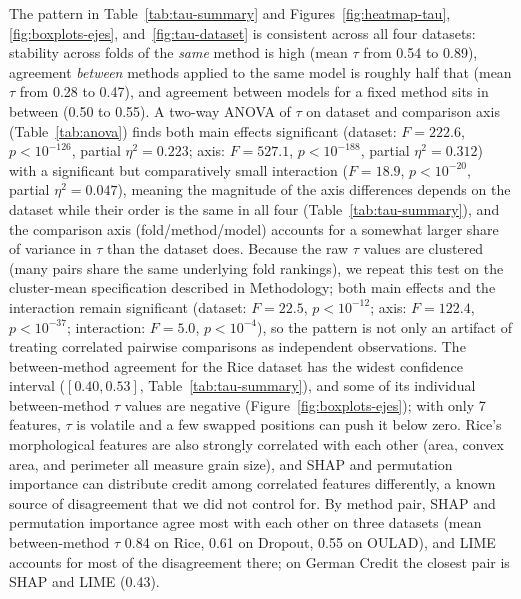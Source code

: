 \documentclass[11pt,twoside,a4paper]{article}
\begin{document}
The pattern in Table~\ref{tab:tau-summary} and Figures~\ref{fig:heatmap-tau}, \ref{fig:boxplots-ejes}, and~\ref{fig:tau-dataset} is consistent across all four datasets: stability across folds of the \emph{same} method is high (mean $\tau$ from 0.54 to 0.89), agreement \emph{between} methods applied to the same model is roughly half that (mean $\tau$ from 0.28 to 0.47), and agreement between models for a fixed method sits in between (0.50 to 0.55). A two-way ANOVA of $\tau$ on dataset and comparison axis (Table~\ref{tab:anova}) finds both main effects significant (dataset: $F=222.6$, $p<10^{-126}$, partial $\eta^2=0.223$; axis: $F=527.1$, $p<10^{-188}$, partial $\eta^2=0.312$) with a significant but comparatively small interaction ($F=18.9$, $p<10^{-20}$, partial $\eta^2=0.047$), meaning the magnitude of the axis differences depends on the dataset while their order is the same in all four (Table~\ref{tab:tau-summary}), and the comparison axis (fold/method/model) accounts for a somewhat larger share of variance in $\tau$ than the dataset does. Because the raw $\tau$ values are clustered (many pairs share the same underlying fold rankings), we repeat this test on the cluster-mean specification described in Methodology; both main effects and the interaction remain significant (dataset: $F=22.5$, $p<10^{-12}$; axis: $F=122.4$, $p<10^{-37}$; interaction: $F=5.0$, $p<10^{-4}$), so the pattern is not only an artifact of treating correlated pairwise comparisons as independent observations. The between-method agreement for the Rice dataset has the widest confidence interval ($[0.40, 0.53]$, Table~\ref{tab:tau-summary}), and some of its individual between-method $\tau$ values are negative (Figure~\ref{fig:boxplots-ejes}); with only 7 features, $\tau$ is volatile and a few swapped positions can push it below zero. Rice's morphological features are also strongly correlated with each other (area, convex area, and perimeter all measure grain size), and SHAP and permutation importance can distribute credit among correlated features differently, a known source of disagreement that we did not control for. By method pair, SHAP and permutation importance agree most with each other on three datasets (mean between-method $\tau$ 0.84 on Rice, 0.61 on Dropout, 0.55 on OULAD), and LIME accounts for most of the disagreement there; on German Credit the closest pair is SHAP and LIME (0.43).
\end{document}
